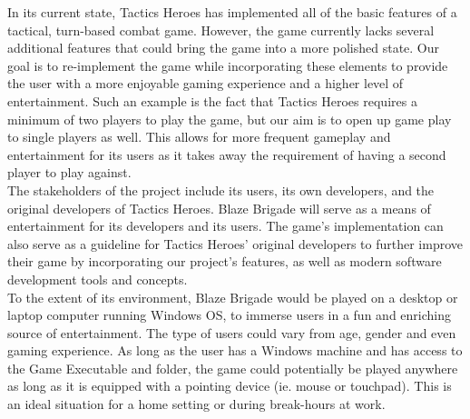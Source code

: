 \documentclass{article}
\begin{document}
In its current state, Tactics Heroes has implemented all of the basic features of a tactical, turn-based combat game. However, the game currently lacks several additional features that could bring the game into a more polished state. Our goal is to re-implement the game while incorporating these elements to provide the user with a more enjoyable gaming experience and a higher level of entertainment. Such an example is the fact that Tactics Heroes requires a minimum of two players to play the game, but our aim is to open up game play to single players as well. This allows for more frequent gameplay and entertainment for its users as it takes away the requirement of having a second player to play against. \\

The stakeholders of the project include its users, its own developers, and the original developers of Tactics Heroes. Blaze Brigade will serve as a means of entertainment for its developers and its users. The game's implementation can also serve as a guideline for Tactics Heroes' original developers to further improve their game by incorporating our project's features, as well as modern software development tools and concepts.\\

To the extent of its environment, Blaze Brigade would be played on a desktop or laptop computer running Windows OS, to immerse users in a fun and enriching source of entertainment. The type of users could vary from age, gender and even gaming experience. As long as the user has a Windows machine and has access to the Game Executable and folder, the game could potentially be played anywhere as long as it is equipped with a pointing device (ie. mouse or touchpad). This is an ideal situation for a home setting or during break-hours at work.
\end{document}
